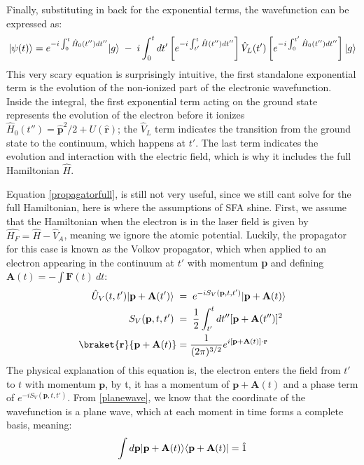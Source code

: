 \documentclass[11pt,a4paper]{report}
\DeclarePairedDelimiter\bra{\langle}{\rvert}
\DeclarePairedDelimiter\ket{\lvert}{\rangle}
\begin{document}
Finally, substituting in back for the exponential terms, the wavefunction can be expressed as:
\begin{equation}
\ket{\psi(t)} = e^{-i\int_{0}^{t} \hat{H}_0(t'')dt''}\ket{g} \; -\; i\int^{t}_{0}dt' \left[e^{-i\int_{t'}^{t} \hat{H}(t'')dt''}\right]\hat{V}_L(t')\left[e^{-i\int_{0}^{t'} \hat{H}_0(t'')dt''}\right]\ket{g}
	\label{propagatorfull}
\end{equation}
This very scary equation is surprisingly intuitive, the first standalone exponential term is the evolution of the non-ionized part of the electronic wavefunction. Inside the integral, the first exponential term acting on the ground state represents the evolution of the electron before it ionizes $\hat{H}_0(t'') = \hat{\mathbf{p}}^2/2 + U(\hat{\mathbf{r}})$; the $\hat{V}_L$ term indicates the transition from the ground state to the continuum, which happens at $t'$. The last term indicates the evolution and interaction with the electric field, which is why it includes the full Hamiltonian $\hat{H}$.


Equation \eqref{propagatorfull}, is still not very useful, since we still cant solve for the full Hamiltonian, here is where the assumptions of SFA shine. First, we assume that the Hamiltonian when the electron is in the laser field is given by $\hat{H_F} = \hat{H} - \hat{V}_A$, meaning we ignore the atomic potential. Luckily, the propagator for this case is known as the Volkov propagator, which when applied to an electron appearing in the continuum at $t'$ with momentum \textbf{p} and defining $\mathbf{A}(t) = -\int \mathbf{F}(t) \: dt$:
\begin{equation}
\begin{split}
\hat{U}_V(t,t')\ket{\mathbf{p} + \mathbf{A}(t')}\; & = \;e^{-iS_V(\mathbf{p},t,t')}\ket{\mathbf{p} + \mathbf{A}(t)} \\
S_V(\mathbf{p},t,t') \; &= \; \frac{1}{2}\int^{t}_{t'}dt''[\mathbf{p} + \mathbf{A}(t'')]^2 \\
\braket{\mathbf{r}}{\mathbf{p} + \mathbf{A}(t)} & = \frac{1}{(2\pi)^{3/2}} e^{i[\mathbf{p} + \mathbf{A}(t)]\cdot \mathbf{r}}
\end{split}
	\label{planewave}
\end{equation}
The physical explanation of this equation is, the electron enters the field from $t'$ to $t$ with momentum $\mathbf{p}$, by t, it has a momentum of $\mathbf{p} + \mathbf{A}(t)$ and a phase term of $e^{-iS_V(\mathbf{p},t,t')}$. From \eqref{planewave}, we know that the coordinate of the wavefunction is a plane wave, which at each moment in time forms a complete basis, meaning:
\begin{equation}
\int d\mathbf{p} \ket{\mathbf{p} + \mathbf{A}(t)} \bra{\mathbf{p} + \mathbf{A}(t)} = \hat{1}
	\label{identity}
\end{equation}
\end{document}
